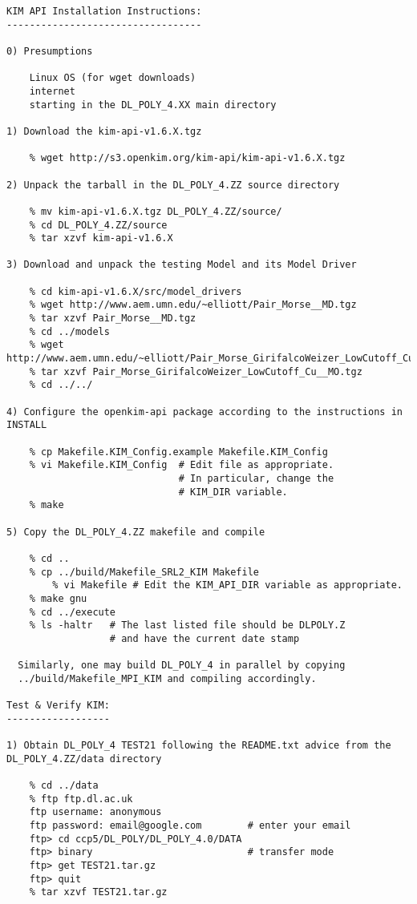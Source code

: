 \begin{verbatim}
KIM API Installation Instructions:
----------------------------------

0) Presumptions

	Linux OS (for wget downloads)
	internet
	starting in the DL_POLY_4.XX main directory

1) Download the kim-api-v1.6.X.tgz

	% wget http://s3.openkim.org/kim-api/kim-api-v1.6.X.tgz

2) Unpack the tarball in the DL_POLY_4.ZZ source directory

	% mv kim-api-v1.6.X.tgz DL_POLY_4.ZZ/source/
	% cd DL_POLY_4.ZZ/source
	% tar xzvf kim-api-v1.6.X

3) Download and unpack the testing Model and its Model Driver

	% cd kim-api-v1.6.X/src/model_drivers
	% wget http://www.aem.umn.edu/~elliott/Pair_Morse__MD.tgz
	% tar xzvf Pair_Morse__MD.tgz
	% cd ../models
	% wget http://www.aem.umn.edu/~elliott/Pair_Morse_GirifalcoWeizer_LowCutoff_Cu__MO.tgz
	% tar xzvf Pair_Morse_GirifalcoWeizer_LowCutoff_Cu__MO.tgz
	% cd ../../

4) Configure the openkim-api package according to the instructions in INSTALL

	% cp Makefile.KIM_Config.example Makefile.KIM_Config
	% vi Makefile.KIM_Config  # Edit file as appropriate.
	                          # In particular, change the
	                          # KIM_DIR variable.
	% make

5) Copy the DL_POLY_4.ZZ makefile and compile

	% cd ..
	% cp ../build/Makefile_SRL2_KIM Makefile
        % vi Makefile # Edit the KIM_API_DIR variable as appropriate.
	% make gnu
	% cd ../execute
	% ls -haltr   # The last listed file should be DLPOLY.Z
	              # and have the current date stamp

  Similarly, one may build DL_POLY_4 in parallel by copying
  ../build/Makefile_MPI_KIM and compiling accordingly.

Test & Verify KIM:
------------------

1) Obtain DL_POLY_4 TEST21 following the README.txt advice from the DL_POLY_4.ZZ/data directory

	% cd ../data
	% ftp ftp.dl.ac.uk
	ftp username: anonymous
	ftp password: email@google.com        # enter your email
	ftp> cd ccp5/DL_POLY/DL_POLY_4.0/DATA
	ftp> binary                           # transfer mode
	ftp> get TEST21.tar.gz
	ftp> quit
	% tar xzvf TEST21.tar.gz


\end{verbatim}
